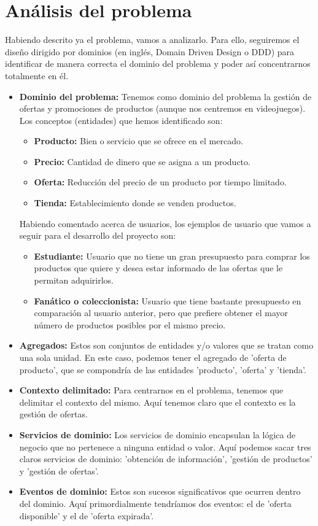 \chapter{Análisis del problema}
 
Habiendo descrito ya el problema, vamos a analizarlo. Para ello, seguiremos el 
diseño dirigido por dominios (en inglés, Domain Driven Design o DDD) \cite{ddd} 
para identificar de manera correcta el dominio del problema y poder así 
concentrarnos totalmente en él.

\begin{itemize}
    \item \textbf{Dominio del problema:} Tenemos como dominio del problema la 
    gestión de ofertas y promociones de productos (aunque nos centremos en 
    videojuegos). Los conceptos (entidades) que hemos identificado son:
    \begin{itemize}
        \item \textbf{Producto:} Bien o servicio que se ofrece en el mercado.
        \item \textbf{Precio:} Cantidad de dinero que se asigna a un producto.
        \item \textbf{Oferta:} Reducción del precio de un producto por tiempo 
        limitado.
        \item \textbf{Tienda:} Establecimiento donde se venden productos.
    \end{itemize}
    Habiendo comentado acerca de usuarios, los ejemplos de usuario que vamos a 
    seguir para el desarrollo del proyecto son:
    \begin{itemize}
        \item \textbf{Estudiante:} Usuario que no tiene un gran presupuesto para 
        comprar los productos que quiere y desea estar informado de las ofertas que 
        le permitan adquirirlos.
        \item \textbf{Fanático o coleccionista:} Usuario que tiene bastante 
        presupuesto en comparación al usuario anterior, pero que prefiere obtener 
        el mayor número de productos posibles por el mismo precio.
    \end{itemize}
    \item \textbf{Agregados:} Estos son conjuntos de entidades y/o valores que se 
    tratan como una sola unidad. En este caso, podemos tener el agregado de 'oferta 
    de producto', que se compondría de las entidades 'producto', 'oferta' y 'tienda'.
    \item \textbf{Contexto delimitado:} Para centrarnos en el problema, tenemos que 
    delimitar el contexto del mismo. Aquí tenemos claro que el contexto es la 
    gestión de ofertas.
    \item \textbf{Servicios de dominio:} Los servicios de dominio encapsulan la 
    lógica de negocio que no pertenece a ninguna entidad o valor. Aquí podemos sacar 
    tres claros servicios de dominio: 'obtención de información', 'gestión de 
    productos' y 'gestión de ofertas'.
    \item \textbf{Eventos de dominio:} Estos son sucesos significativos que ocurren 
    dentro del dominio. Aquí primordialmente tendríamos dos eventos: el de 'oferta 
    disponible' y el de 'oferta expirada'.
\end{itemize}
